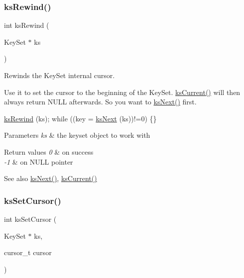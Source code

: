 \subsubsection{\texorpdfstring{ks\+Rewind()}{ksRewind()}}
{\footnotesize\ttfamily int ks\+Rewind (\begin{DoxyParamCaption}\item[{Key\+Set $\ast$}]{ks }\end{DoxyParamCaption})}



Rewinds the Key\+Set internal cursor. 

Use it to set the cursor to the beginning of the Key\+Set. \hyperlink{group__keyset_ga4287b9416912c5f2ab9c195cb74fb094}{ks\+Current()} will then always return N\+U\+LL afterwards. So you want to \hyperlink{group__keyset_ga317321c9065b5a4b3e33fe1c399bcec9}{ks\+Next()} first.


\begin{DoxyCode}
\hyperlink{group__keyset_gabe793ff51f1728e3429c84a8a9086b70}{ksRewind} (ks);
\textcolor{keywordflow}{while} ((key = \hyperlink{group__keyset_ga317321c9065b5a4b3e33fe1c399bcec9}{ksNext} (ks))!=0) \{\}
\end{DoxyCode}



\begin{DoxyParams}{Parameters}
{\em ks} & the keyset object to work with \\
\hline
\end{DoxyParams}

\begin{DoxyRetVals}{Return values}
{\em 0} & on success \\
\hline
{\em -\/1} & on N\+U\+LL pointer \\
\hline
\end{DoxyRetVals}
\begin{DoxySeeAlso}{See also}
\hyperlink{group__keyset_ga317321c9065b5a4b3e33fe1c399bcec9}{ks\+Next()}, \hyperlink{group__keyset_ga4287b9416912c5f2ab9c195cb74fb094}{ks\+Current()} 
\end{DoxySeeAlso}
\mbox{\label{group__keyset_gad94c9ffaa3e8034564c0712fd407c345}} 
\subsubsection{\texorpdfstring{ks\+Set\+Cursor()}{ksSetCursor()}}
{\footnotesize\ttfamily int ks\+Set\+Cursor (\begin{DoxyParamCaption}\item[{Key\+Set $\ast$}]{ks,  }\item[{cursor\+\_\+t}]{cursor }\end{DoxyParamCaption})}



